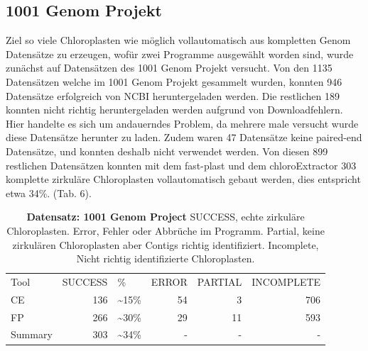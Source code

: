 \documentclass{scrartcl}
\begin{document}
\subsection{1001 Genom Projekt}
\label{sec-4-6}
Ziel so viele Chloroplasten wie möglich vollautomatisch aus kompletten Genom Datensätze zu erzeugen, wofür zwei Programme ausgewählt worden sind, wurde zunächst auf Datensätzen 
des 1001 Genom Projekt versucht.
Von den 1135 Datensätzen welche im 1001 Genom Projekt gesammelt wurden, konnten 946 Datensätze erfolgreich von NCBI heruntergeladen werden. Die restlichen 189 konnten nicht richtig heruntergeladen werden aufgrund von Downloadfehlern.
Hier handelte es sich um andauerndes Problem, da mehrere male versucht wurde diese Datensätze herunter zu laden. 
Zudem waren 47 Datensätze keine paired-end Datensätze, und konnten deshalb nicht verwendet werden. Von diesen 899 restlichen Datensätzen konnten mit dem fast-plast und dem chloroExtractor 303 komplette zirkuläre Chloroplasten 
vollautomatisch gebaut werden, dies entspricht etwa 34\%. (Tab. 6). 
\begin{table}[!h]
\caption[Datensatz: 1001 Genom Project]{\textbf{Datensatz: 1001 Genom Project} SUCCESS, echte zirkuläre Chloroplasten. Error, Fehler oder Abbrüche im Programm. Partial, keine zirkulären Chloroplasten aber Contigs richtig identifiziert. Incomplete, Nicht richtig identifizierte Chloroplasten.}
\begin{center}
\begin{tabular}{lrlrrr}
Tool & SUCCESS & \% & ERROR & PARTIAL & INCOMPLETE\\
CE & 136 & \textasciitilde{}15\% & 54 & 3 & 706\\
FP & 266 & \textasciitilde{}30\% & 29 & 11 & 593\\
Summary & 303 & \textasciitilde{}34\% & - & - & -\\
\end{tabular}
\end{center}
\end{table}
\end{document}
